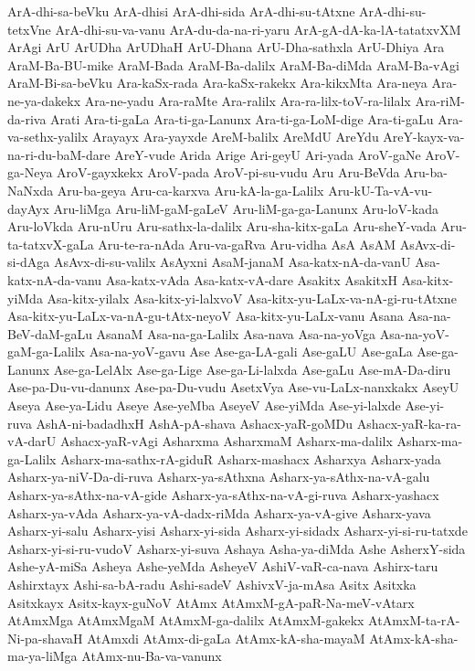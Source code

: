 {ArA-dhi-sa-beVku
ArA-dhisi
ArA-dhi-sida
ArA-dhi-su-tAtxne
ArA-dhi-su-tetxVne
ArA-dhi-su-va-vanu
ArA-du-da-na-ri-yaru
ArA-gA-dA-ka-lA-tatatxvXM
ArAgi
ArU
ArUDha
ArUDhaH
ArU-Dhana
ArU-Dha-sathxla
ArU-Dhiya
Ara
AraM-Ba-BU-mike
AraM-Bada
AraM-Ba-dalilx
AraM-Ba-diMda
AraM-Ba-vAgi
AraM-Bi-sa-beVku
Ara-kaSx-rada
Ara-kaSx-rakekx
Ara-kikxMta
Ara-neya
Ara-ne-ya-dakekx
Ara-ne-yadu
Ara-raMte
Ara-ralilx
Ara-ra-lilx-toV-ra-lilalx
Ara-riM-da-riva
Arati
Ara-ti-gaLa
Ara-ti-ga-Lanunx
Ara-ti-ga-LoM-dige
Ara-ti-gaLu
Ara-va-sethx-yalilx
Arayayx
Ara-yayxde
AreM-balilx
AreMdU
AreYdu
AreY-kayx-va-na-ri-du-baM-dare
AreY-vude
Arida
Arige
Ari-geyU
Ari-yada
AroV-gaNe
AroV-ga-Neya
AroV-gayxkekx
AroV-pada
AroV-pi-su-vudu
Aru
Aru-BeVda
Aru-ba-NaNxda
Aru-ba-geya
Aru-ca-karxva
Aru-kA-la-ga-Lalilx
Aru-kU-Ta-vA-vu-dayAyx
Aru-liMga
Aru-liM-gaM-gaLeV
Aru-liM-ga-ga-Lanunx
Aru-loV-kada
Aru-loVkda
Aru-nUru
Aru-sathx-la-dalilx
Aru-sha-kitx-gaLa
Aru-sheY-vada
Aru-ta-tatxvX-gaLa
Aru-te-ra-nAda
Aru-va-gaRva
Aru-vidha
AsA
AsAM
AsAvx-di-si-dAga
AsAvx-di-su-valilx
AsAyxni
AsaM-janaM
Asa-katx-nA-da-vanU
Asa-katx-nA-da-vanu
Asa-katx-vAda
Asa-katx-vA-dare
Asakitx
AsakitxH
Asa-kitx-yiMda
Asa-kitx-yilalx
Asa-kitx-yi-lalxvoV
Asa-kitx-yu-LaLx-va-nA-gi-ru-tAtxne
Asa-kitx-yu-LaLx-va-nA-gu-tAtx-neyoV
Asa-kitx-yu-LaLx-vanu
Asana
Asa-na-BeV-daM-gaLu
AsanaM
Asa-na-ga-Lalilx
Asa-nava
Asa-na-yoVga
Asa-na-yoV-gaM-ga-Lalilx
Asa-na-yoV-gavu
Ase
Ase-ga-LA-gali
Ase-gaLU
Ase-gaLa
Ase-ga-Lanunx
Ase-ga-LelAlx
Ase-ga-Lige
Ase-ga-Li-lalxda
Ase-gaLu
Ase-mA-Da-diru
Ase-pa-Du-vu-danunx
Ase-pa-Du-vudu
AsetxVya
Ase-vu-LaLx-nanxkakx
AseyU
Aseya
Ase-ya-Lidu
Aseye
Ase-yeMba
AseyeV
Ase-yiMda
Ase-yi-lalxde
Ase-yi-ruva
AshA-ni-badadhxH
AshA-pA-shava
Ashacx-yaR-goMDu
Ashacx-yaR-ka-ra-vA-darU
Ashacx-yaR-vAgi
Asharxma
AsharxmaM
Asharx-ma-dalilx
Asharx-ma-ga-Lalilx
Asharx-ma-sathx-rA-giduR
Asharx-mashacx
Asharxya
Asharx-yada
Asharx-ya-niV-Da-di-ruva
Asharx-ya-sAthxna
Asharx-ya-sAthx-na-vA-galu
Asharx-ya-sAthx-na-vA-gide
Asharx-ya-sAthx-na-vA-gi-ruva
Asharx-yashacx
Asharx-ya-vAda
Asharx-ya-vA-dadx-riMda
Asharx-ya-vA-give
Asharx-yava
Asharx-yi-salu
Asharx-yisi
Asharx-yi-sida
Asharx-yi-sidadx
Asharx-yi-si-ru-tatxde
Asharx-yi-si-ru-vudoV
Asharx-yi-suva
Ashaya
Asha-ya-diMda
Ashe
AsherxY-sida
Ashe-yA-miSa
Asheya
Ashe-yeMda
AsheyeV
AshiV-vaR-ca-nava
Ashirx-taru
Ashirxtayx
Ashi-sa-bA-radu
Ashi-sadeV
AshivxV-ja-mAsa
Asitx
Asitxka
Asitxkayx
Asitx-kayx-guNoV
AtAmx
AtAmxM-gA-paR-Na-meV-vAtarx
AtAmxMga
AtAmxMgaM
AtAmxM-ga-dalilx
AtAmxM-gakekx
AtAmxM-ta-rA-Ni-pa-shavaH
AtAmxdi
AtAmx-di-gaLa
AtAmx-kA-sha-mayaM
AtAmx-kA-sha-ma-ya-liMga
AtAmx-nu-Ba-va-vanunx
}
